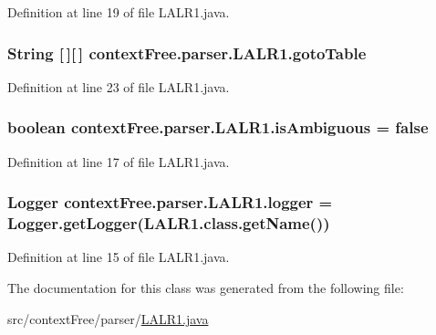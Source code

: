 Definition at line 19 of file L\-A\-L\-R1.\-java.

\hypertarget{classcontext_free_1_1parser_1_1_l_a_l_r1_a6f27da8ba10ef81be36845b0fffc9858}{
\subsubsection[{goto\-Table}]{\setlength{\rightskip}{0pt plus 5cm}String \mbox{[}$\,$\mbox{]}\mbox{[}$\,$\mbox{]} {\bf context\-Free.\-parser.\-L\-A\-L\-R1.\-goto\-Table}}}\label{classcontext_free_1_1parser_1_1_l_a_l_r1_a6f27da8ba10ef81be36845b0fffc9858}


Definition at line 23 of file L\-A\-L\-R1.\-java.

\hypertarget{classcontext_free_1_1parser_1_1_l_a_l_r1_a3e69dd16d8b89cc9a210286efe0aa0d8}{
\subsubsection[{is\-Ambiguous}]{\setlength{\rightskip}{0pt plus 5cm}boolean {\bf context\-Free.\-parser.\-L\-A\-L\-R1.\-is\-Ambiguous} = false}}\label{classcontext_free_1_1parser_1_1_l_a_l_r1_a3e69dd16d8b89cc9a210286efe0aa0d8}


Definition at line 17 of file L\-A\-L\-R1.\-java.

\hypertarget{classcontext_free_1_1parser_1_1_l_a_l_r1_a9684757c9b143a5b82609c1de472400e}{
\subsubsection[{logger}]{\setlength{\rightskip}{0pt plus 5cm}Logger {\bf context\-Free.\-parser.\-L\-A\-L\-R1.\-logger} = Logger.\-get\-Logger(L\-A\-L\-R1.\-class.\-get\-Name())}}\label{classcontext_free_1_1parser_1_1_l_a_l_r1_a9684757c9b143a5b82609c1de472400e}


Definition at line 15 of file L\-A\-L\-R1.\-java.



The documentation for this class was generated from the following file\-:\begin{DoxyCompactItemize}
\item 
src/context\-Free/parser/\hyperlink{_l_a_l_r1_8java}{L\-A\-L\-R1.\-java}\end{DoxyCompactItemize}
